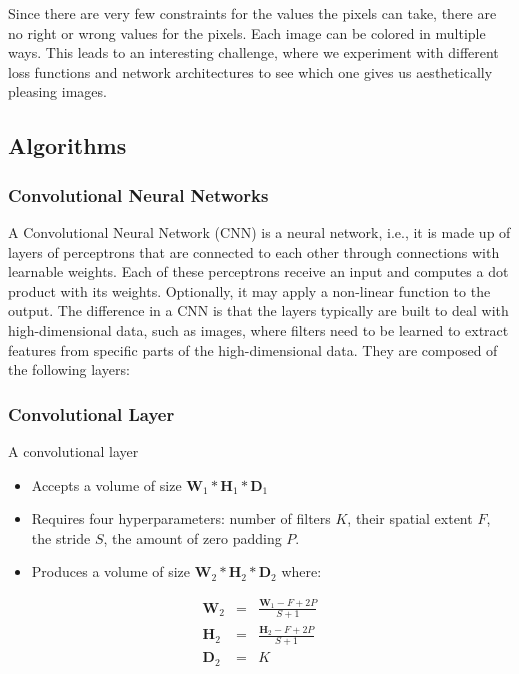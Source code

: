\documentclass{article}
\begin{document}
Since there are very few constraints for the values the pixels can take, there
are no right or wrong values for the pixels. Each image can be colored in
multiple ways. This leads to an interesting challenge, where we experiment with
different loss functions and network architectures to see which one gives us
aesthetically pleasing images.

\subsection{Algorithms}

\subsubsection{Convolutional Neural Networks}

A Convolutional Neural Network (CNN) is a neural network, i.e., it is made up of
layers of perceptrons that are connected to each other through connections with
learnable weights. Each of these perceptrons receive an input and computes a dot
product with its weights. Optionally, it may apply a non-linear function to the
output. The difference in a CNN is that the layers typically are built to deal
with high-dimensional data, such as images, where filters need to be learned to
extract features from specific parts of the high-dimensional data. They are
composed of the following layers:

\subsubsection{Convolutional Layer}

A convolutional layer

\begin{itemize}
  \item Accepts a volume of size $\mathbf{W}_1 * \mathbf{H}_1 * \mathbf{D}_1$
  \item Requires four hyperparameters: number of filters
  $K$, their spatial extent $F$, the stride $S$, the amount of zero padding $P$.
  \item Produces a volume of size $\mathbf{W}_2 * \mathbf{H}_2 * \mathbf{D}_2$ where:
\end{itemize}

\begin{eqnarray} \nonumber
  \mathbf{W}_2 & = & \frac{\mathbf{W}_1 - F + 2P}{S + 1} \\ \nonumber
  \mathbf{H}_2 & = & \frac{\mathbf{H}_2 - F + 2P}{S + 1} \\ \nonumber
  \mathbf{D}_2 & = & K \nonumber
\end{eqnarray}
\end{document}
